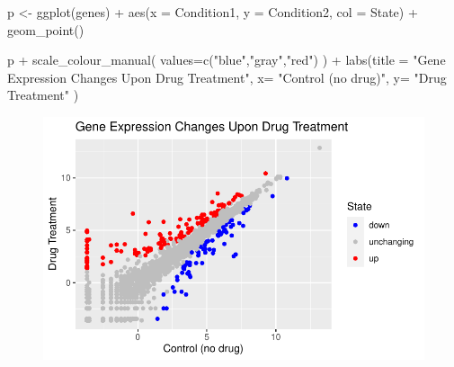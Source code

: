 \documentclass[
  letterpaper,
  DIV=11,
  numbers=noendperiod]{scrartcl}
\newenvironment{Shaded}{\begin{snugshade}}{\end{snugshade}}
\newcommand{\AttributeTok}[1]{\textcolor[rgb]{0.40,0.45,0.13}{#1}}
\newcommand{\FunctionTok}[1]{\textcolor[rgb]{0.28,0.35,0.67}{#1}}
\newcommand{\NormalTok}[1]{\textcolor[rgb]{0.00,0.23,0.31}{#1}}
\newcommand{\OtherTok}[1]{\textcolor[rgb]{0.00,0.23,0.31}{#1}}
\newcommand{\SpecialCharTok}[1]{\textcolor[rgb]{0.37,0.37,0.37}{#1}}
\newcommand{\StringTok}[1]{\textcolor[rgb]{0.13,0.47,0.30}{#1}}
\begin{document}
\begin{Shaded}
\begin{Highlighting}[]
\NormalTok{p }\OtherTok{\textless{}{-}} \FunctionTok{ggplot}\NormalTok{(genes) }\SpecialCharTok{+}
  \FunctionTok{aes}\NormalTok{(}\AttributeTok{x =}\NormalTok{ Condition1, }\AttributeTok{y =}\NormalTok{ Condition2, }\AttributeTok{col =}\NormalTok{ State) }\SpecialCharTok{+}
  \FunctionTok{geom\_point}\NormalTok{()}

\NormalTok{p }\SpecialCharTok{+} \FunctionTok{scale\_colour\_manual}\NormalTok{( }\AttributeTok{values=}\FunctionTok{c}\NormalTok{(}\StringTok{"blue"}\NormalTok{,}\StringTok{"gray"}\NormalTok{,}\StringTok{"red"}\NormalTok{) ) }\SpecialCharTok{+} 
  \FunctionTok{labs}\NormalTok{(}\AttributeTok{title =} \StringTok{"Gene Expression Changes Upon Drug Treatment"}\NormalTok{, }\AttributeTok{x=} \StringTok{"Control (no drug)"}\NormalTok{, }\AttributeTok{y=} \StringTok{"Drug Treatment"}\NormalTok{ )}
\end{Highlighting}
\end{Shaded}

\begin{figure}[H]

{\centering \includegraphics{class5_lab_bggn_files/figure-pdf/unnamed-chunk-9-1.pdf}

}

\end{figure}
\end{document}

